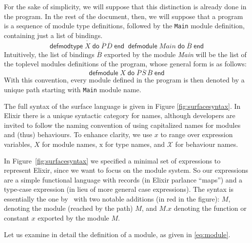 \documentclass[a4paper,10pt]{article}
\DeclareMathOperator{\kwdefmt}{\textsf{defmodtype}}
\DeclareMathOperator{\kwend}{\textsf{end}}
\DeclareMathOperator{\kwdo}{\textsf{do}}
\DeclareMathOperator{\kwdefm}{\textsf{defmodule}}
\newcommand{\tx}{\textrm{x}}
\begin{document}
For the sake of simplicity, we will suppose that this distinction is already done in the program. In the rest of the document, then, we will suppose that a program is a sequence of module type definitions, followed by the \texttt{Main} module definition, containing just a list of bindings. 
\[\overline{\kwdefmt X \kwdo \overline{P}\, \overline{D} \kwend}\kwdefm \textit{Main} \kwdo \overline{B} \kwend\]
Intuitively, the list of bindings $\overline{B}$ exported by the module \textit{Main} will be the list of the toplevel modules definitions of the program, whose general form is as follows: 
\begin{equation}\label{eq:module}
\kwdefm X \kwdo \overline{P}\, \overline{S}\, \overline{B} \kwend
\end{equation}
With this convention, every module defined in the program is then denoted by a unique path starting with \texttt{Main} module name.

The full syntax of the surface language is given in Figure \ref{fig:surfacesyntax}. In Elixir there is a unique syntactic category for names, although developers are invited to follow the naming convention of using capitalized names for modules and (thus) behaviours. To enhance clarity, we use $x$ to range over expression variables, $X$ for module names, $\tx$ for type names, and $\mathcal X$ for behaviour names. 

In Figure~\ref{fig:surfacesyntax} we specified a minimal set of expressions to represent Elixir, since we want to focus on the module system. So our expressions are a simple functional language with records (in Elixir parlance ``maps'') and a type-case expression (in lieu of more general case expressions). The syntax is essentially the one by~\cite{CDV24} with two notable additions (in red in the figure): $M$, denoting the module (reached by the path) $M$, and $M.x$ denoting the function or constant $x$ exported by the module $M$.

Let us examine in detail the definition of a module, as given in \eqref{eq:module}.
\end{document}
